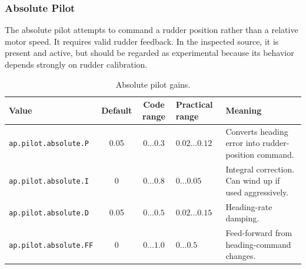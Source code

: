 \documentclass[11pt,twocolumn]{article}
\begin{document}
\subsubsection{Absolute Pilot}
The absolute pilot attempts to command a rudder position rather than a
relative motor speed.  It requires valid rudder feedback.  In the inspected
source, it is present and active, but should be regarded as experimental
because its behavior depends strongly on rudder calibration.
\begin{table}[t]
\centering
\caption{Absolute pilot gains.}
\label{tab:pypilot-absolute-gains}
\begin{tabularx}{\textwidth}{Z{0.23\textwidth}c c Z{0.16\textwidth}Y}
\toprule
Value & Default & Code range & Practical range & Meaning \\
\midrule
\texttt{ap.pilot.absolute.P} &
\num{0.05} &
\(\num{0}\ldots\num{0.3}\) &
\(\num{0.02}\ldots\num{0.12}\) &
Converts heading error into rudder-position command. \\
\texttt{ap.pilot.absolute.I} &
\num{0} &
\(\num{0}\ldots\num{0.8}\) &
\(\num{0}\ldots\num{0.05}\) &
Integral correction.  Can wind up if used aggressively. \\
\texttt{ap.pilot.absolute.D} &
\num{0.05} &
\(\num{0}\ldots\num{0.5}\) &
\(\num{0.02}\ldots\num{0.15}\) &
Heading-rate damping. \\
\texttt{ap.pilot.absolute.FF} &
\num{0} &
\(\num{0}\ldots\num{1.0}\) &
\(\num{0}\ldots\num{0.5}\) &
Feed-forward from heading-command changes. \\
\bottomrule
\end{tabularx}
\end{table}
\end{document}
